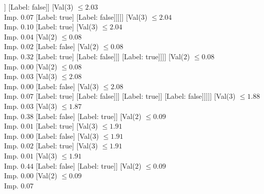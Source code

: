 \documentclass[margin=10pt]{standalone}
\begin{document}
\begin{forest}
															[Label: true]
															[Val($3$) $ \leq 2.03$ \\ Imp. $0.00$
																[Val($3$) $ \leq 2.02$ \\ Imp. $0.00$
																	[Val($3$) $ \leq 2.02$ \\ Imp. $0.13$
																		[Label: false]
																		[Label: true]]
																	[Label: false]]
																[Val($3$) $ \leq 2.03$ \\ Imp. $0.07$
																	[Label: true]
																	[Label: false]]]]]
													[Val($3$) $ \leq 2.04$ \\ Imp. $0.10$
														[Label: true]
														[Val($3$) $ \leq 2.04$ \\ Imp. $0.04$
															[Val($2$) $ \leq 0.08$ \\ Imp. $0.02$
																[Label: false]
																[Val($2$) $ \leq 0.08$ \\ Imp. $0.32$
																	[Label: true]
																	[Label: false]]]
															[Label: true]]]]
												[Val($2$) $ \leq 0.08$ \\ Imp. $0.00$
													[Val($2$) $ \leq 0.08$ \\ Imp. $0.03$
														[Val($3$) $ \leq 2.08$ \\ Imp. $0.00$
															[Label: false]
															[Val($3$) $ \leq 2.08$ \\ Imp. $0.07$
																[Label: true]
																[Label: false]]]
														[Label: true]]
													[Label: false]]]]]
									[Val($3$) $ \leq 1.88$ \\ Imp. $0.03$
										[Val($3$) $ \leq 1.87$ \\ Imp. $0.38$
											[Label: false]
											[Label: true]]
										[Val($2$) $ \leq 0.09$ \\ Imp. $0.01$
											[Label: true]
											[Val($3$) $ \leq 1.91$ \\ Imp. $0.00$
												[Label: false]
												[Val($3$) $ \leq 1.91$ \\ Imp. $0.02$
													[Label: true]
													[Val($3$) $ \leq 1.91$ \\ Imp. $0.01$
														[Val($3$) $ \leq 1.91$ \\ Imp. $0.44$
															[Label: false]
															[Label: true]]
														[Val($2$) $ \leq 0.09$ \\ Imp. $0.00$
															[Val($2$) $ \leq 0.09$ \\ Imp. $0.07$

\end{forest}
\end{document}
